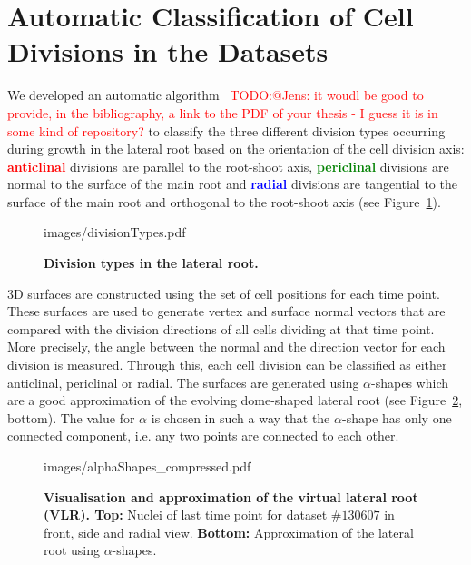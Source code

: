 \documentclass[11pt,a4paper, final]{article}
\newcommand{\TODO}[1]{
\textcolor{red}{TODO:#1}
}
\begin{document}
\section{Automatic Classification of Cell Divisions in the Datasets}
\label{sec:divisionTypes}
\noindent
We developed an automatic algorithm~\cite[chapter 4]{FangerauDiss_2015}\TODO{@Jens: it woudl be good to provide, in the bibliography, a link to the PDF of your thesis - I guess it is in some kind of repository?} to classify the three different division types occurring during growth in the lateral root based on the orientation of the cell division axis: \textcolor{red}{\textbf{anticlinal}} divisions are parallel to the root-shoot axis, \textcolor{green}{\textbf{periclinal}} divisions are normal to the surface of the main root and \textcolor{blue}{\textbf{radial}} divisions are tangential to the surface of the main root and orthogonal to the root-shoot axis (see Figure~\ref{fig:divisionTypes}).
%
\begin{figure}[htbp]
	\begin{center}
		\begin{overpic}[width=0.8\linewidth]{images/divisionTypes.pdf}
		\end{overpic}
\caption[]
{
{\bf Division types in the lateral root.}
}
	\label{fig:divisionTypes}
	\end{center}
\end{figure}
%
3D surfaces are constructed using the set of cell positions for each time point. These surfaces are used to generate vertex and surface normal vectors that are compared with the division directions of all cells dividing at that time point. More precisely, the angle between the normal and the direction vector for each division is measured. Through this, each cell division can be classified as either anticlinal, periclinal or radial. The surfaces are generated using $\alpha$-shapes which are a good approximation of the evolving dome-shaped lateral root (see Figure~\ref{fig:alphaShapes}, bottom). The value for $\alpha$ is chosen in such a way that the $\alpha$-shape has only one connected component, i.e. any two points are connected to each other.
%
\begin{figure}[htbp]
	\begin{center}
		\begin{overpic}[width=1.\linewidth]{images/alphaShapes_compressed.pdf}
		\end{overpic}
\caption[]
{
{\bf Visualisation and approximation of the virtual lateral root (VLR). Top:} Nuclei of last time point for dataset $\# 130607$ in front, side and radial view. {\bf Bottom:} Approximation of the lateral root using $\alpha$-shapes.
}
	\label{fig:alphaShapes}
	\end{center}
\end{figure}
\end{document}
